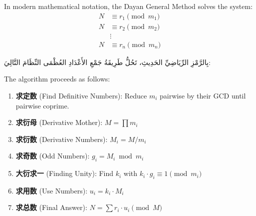 \documentclass[11pt,a4paper]{article}
\newcommand{\ar}[1]{\arabicfont\beginR #1\endR}
\begin{document}
\vspace{1em}

In modern mathematical notation, the Dayan General Method solves the system:
\begin{align*}
N &\equiv r_1 \pmod{m_1} \\
N &\equiv r_2 \pmod{m_2} \\
  &\vdots \\
N &\equiv r_n \pmod{m_n}
\end{align*}

\begin{center}
\ar{بِالرَّمْزِ الرِّيَاضِيِّ الحَدِيثِ، تَحُلُّ طَرِيقَةُ جَمْعِ الأَعْدَادِ العُظْمَى النِّظَامَ التَّالِيَ:}
\end{center}

\vspace{1em}

The algorithm proceeds as follows:
\begin{enumerate}[label=Step \arabic*.]
  \item \textbf{求定数} (Find Definitive Numbers): Reduce $m_i$ pairwise by their GCD until pairwise coprime.
  \item \textbf{求衍母} (Derivative Mother): $M = \prod m_i$
  \item \textbf{求衍数} (Derivative Numbers): $M_i = M / m_i$
  \item \textbf{求奇数} (Odd Numbers): $g_i = M_i \bmod m_i$
  \item \textbf{大衍求一} (Finding Unity): Find $k_i$ with $k_i \cdot g_i \equiv 1 \pmod{m_i}$
  \item \textbf{求用数} (Use Numbers): $u_i = k_i \cdot M_i$
  \item \textbf{求总数} (Final Answer): $N = \sum r_i \cdot u_i \pmod{M}$
\end{enumerate}
\end{document}
